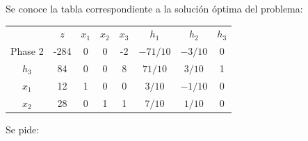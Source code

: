 Se conoce la tabla correspondiente a la solución óptima del problema:
\begin{center}
\begin{tabular}{c|c|cccccc|}
 & $z$ & $x_1$ & $x_2$ & $x_3$ & $h_1$ & $h_2$ & $h_3$\\ 
Phase 2 & -284 & 0 & 0 & -2 & $-71/10$ & $-3/10$ & 0 \\ 
\hline
$h_3$ & 84  & 0 & 0 & 8 & $71/10$ & $3/10$ & 1\\ 
$x_1$ & 12  & 1 & 0 & 0 & $3/10$ & $-1/10$ & 0\\ 
$x_2$ & 28  & 0 & 1 & 1 & $7/10$ & $1/10$ & 0\\ 
\hline
\end{tabular}
\end{center}



Se pide:

